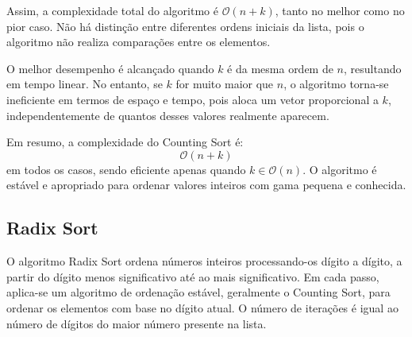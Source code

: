 \documentclass[conference]{IEEEtran}
\begin{document}
Assim, a complexidade total do algoritmo é \(\mathcal{O}(n + k)\), tanto no melhor como no pior caso. Não há distinção entre diferentes ordens iniciais da lista, pois o algoritmo não realiza comparações entre os elementos.

O melhor desempenho é alcançado quando \( k \) é da mesma ordem de \( n \), resultando em tempo linear. No entanto, se \( k \) for muito maior que \( n \), o algoritmo torna-se ineficiente em termos de espaço e tempo, pois aloca um vetor proporcional a \( k \), independentemente de quantos desses valores realmente aparecem.

Em resumo, a complexidade do Counting Sort é:
\[
\mathcal{O}(n + k)
\]
em todos os casos, sendo eficiente apenas quando \( k \in \mathcal{O}(n) \). O algoritmo é estável e apropriado para ordenar valores inteiros com gama pequena e conhecida.

\subsection{Radix Sort}

O algoritmo Radix Sort ordena números inteiros processando-os dígito a dígito, a partir do dígito menos significativo até ao mais significativo. Em cada passo, aplica-se um algoritmo de ordenação estável, geralmente o Counting Sort, para ordenar os elementos com base no dígito atual. O número de iterações é igual ao número de dígitos do maior número presente na lista.
\end{document}
